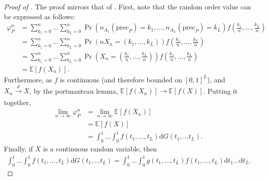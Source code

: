 \documentclass[a4paper]{article}
\newcommand{\dt}{\mathrm{d}t}
\newcommand{\dG}{\mathrm{d}G}
\newcommand{\E}{\mathbb{E}}
\newcommand{\precede}{\mathrm{prec}}
\begin{document}
\begin{proof}[Proof of ]
    The proof mirrors that of .
    First, note that the random order value can be expressed as follows:
    \begin{align*}
        \varphi_P^n &= \sum_{k_1=0}^n \dots \sum_{k_L=0}^n \Pr(n_{A_1}(\precede_P) = k_1, \dots, n_{A_L}(\precede_P) = k_L) f\left(\frac{k_1}{n}, \dots, \frac{k_L}{n}\right) \\
        &= \sum_{k_1=0}^n \dots \sum_{k_L=0}^n \Pr(n X_n = (k_1, \dots, k_L)) f\left(\frac{k_1}{n}, \dots, \frac{k_L}{n}\right) \\
        &= \sum_{k_1=0}^n \dots \sum_{k_L=0}^n \Pr \left( X_n = \left(\frac{k_1}{n}, \dots, \frac{k_L}{n}\right) \right) f \left(\frac{k_1}{n}, \dots, \frac{k_L}{n}\right) \\
        &= \E[f(X_n)].
    \end{align*}
    Furthermore, as $f$ is continuous (and therefore bounded on $[0, 1]^L$), and $X_n \xrightarrow[]{d} X$, by the portmanteau lemma, $\E[f(X_n)] \to \E[f(X)]$.
    Putting it together,
    \begin{align*}
        \lim_{n \to \infty} \varphi_P^n &= \lim_{n \to \infty} \E[f(X_n)] \\
        &= \E[f(X)] \\
        &= \int_0^1 \dots \int_0^1 f(t_1, \dots, t_L) \dG(t_1, \dots t_L).
    \end{align*}
    Finally, if $X$ is a continuous random variable, then
    \begin{align*}
        \int_0^1 \dots \int_0^1 f(t_1, \dots, t_L) \dG(t_1, \dots t_L) = \int_0^1\dots \int_0^1 g(t_1, \dots, t_L) f(t_1, \dots, t_L) \dt_1 \dots \dt_L.
    \end{align*}
\end{proof}
\end{document}
